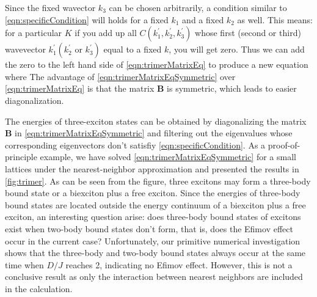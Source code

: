 Since the fixed wavector $k_3$ can be chosen arbitrarily, a condition similar to  \autoref{eqn:specificCondition} will
holds for a fixed $k_1$ and a fixed $k_2$ as well. This means:  for a particular $K$ if you add up all  
$C(k_1^{'}, k_2^{'}, k_3^{'})$ whose first (second or third) wavevector $k_1^{'} ( k_2^{'} \mbox{ or }  k_3^{'})$ equal to a fixed $k$, you will get zero. Thus we can add the zero
 to the left hand side of \autoref{eqn:trimerMatrixEq} to produce a new equation
where
The advantage of \autoref{eqn:trimerMatrixEqSymmetric} over \autoref{eqn:trimerMatrixEq} is that the matrix
$\mathbf{B}$ is symmetric, which leads to easier diagonalization. 

The energies of three-exciton states can be obtained by diagonalizing the matrix $\mathbf{B}$ in
 \autoref{eqn:trimerMatrixEqSymmetric} and filtering out the eigenvalues whose corresponding eigenvectors don't
 satisfiy \autoref{eqn:specificCondition}. As a proof-of-principle example, we have solved
 \autoref{eqn:trimerMatrixEqSymmetric} for a small lattices under the nearest-neighbor approximation and presented
 the results  in \autoref{fig:trimer}. As can be seen from the figure, three excitons may
form a three-body bound state or a biexciton plus a free exciton. Since the energies of three-body bound states are
located outside the energy continuum of a biexciton plus a free exciton, an interesting question arise: does 
three-body bound states of excitons exist when two-body bound states don't form, that is, does the Efimov effect
 occur in the current case? Unfortunately, our primitive numerical investigation shows that the three-body and
 two-body bound states always occur at the same time when $D/J$ reaches 2, indicating no Efimov effect. However,
this is not a conclusive result as only the interaction between nearest neighbors are included in the calculation. 

